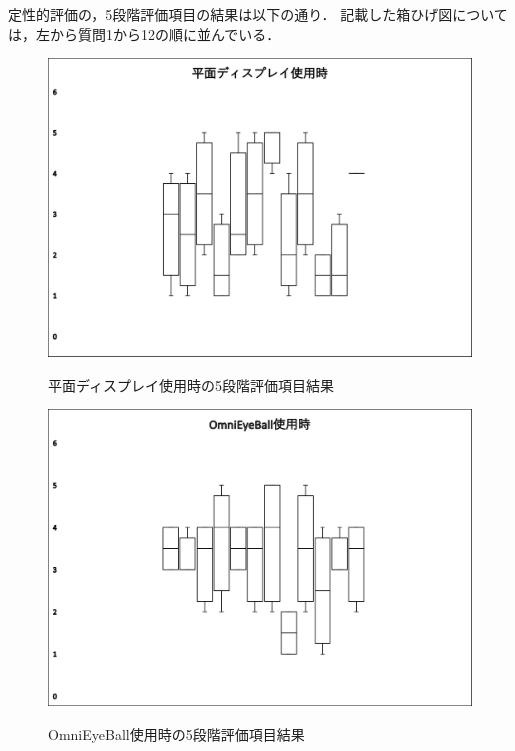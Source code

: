 定性的評価の，5段階評価項目の結果は以下の通り．
記載した箱ひげ図については，左から質問1から12の順に並んでいる．
\begin{figure}[tp]
  \centering
  \includegraphics[scale=0.9]{fig/boxplot1.png}\label{boxplot1}
  \caption{平面ディスプレイ使用時の5段階評価項目結果}
  \includegraphics[scale=0.9]{fig/boxplot2.png}\label{boxplot2}
  \caption{OmniEyeBall使用時の5段階評価項目結果}
\end{figure}




